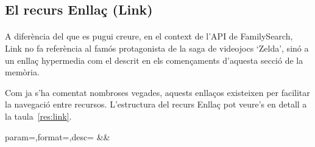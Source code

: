 \subsection{El recurs Enllaç (Link)}

    \paragraph{}
    A diferència del que es pugui creure, en el context de l'API de FamilySearch, Link no fa referència al famós protagonista de la saga de videojocs `Zelda', sinó a un enllaç hypermedia com el descrit en els començaments d'aquesta secció de la memòria.

    Com ja s'ha comentat nombroses vegades, aquests enllaços existeixen per facilitar la navegació entre recursos. L'estructura del recurs Enllaç pot veure's en detall a la taula~\ref{res:link}.

    \begin{center}
             {param=\param,format=\format,desc=\desc}
             {\param&\format&\desc}
     \end{center}
